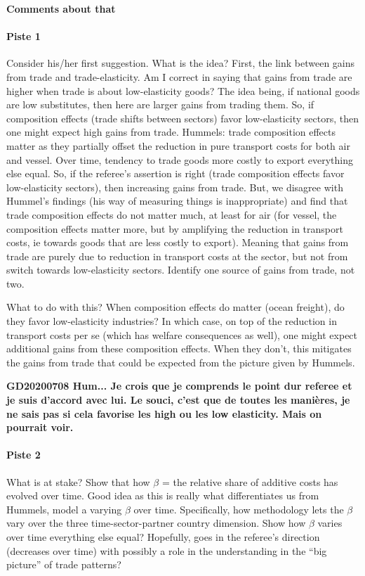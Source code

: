 \documentclass[a4paper,12pt]{article}
\begin{document}
\textbf{Comments about that}

\paragraph{Piste 1} Consider his/her first suggestion. What is the idea? First, the link between gains from trade and trade-elasticity. Am I correct in saying that gains from trade are higher when trade is about low-elasticity goods? The idea being, if national goods are low substitutes, then here are larger gains from trading them. So, if composition effects (trade shifts between sectors) favor low-elasticity sectors, then one might expect high gains from trade. Hummels: trade composition effects matter as they partially offset the reduction in pure transport costs for both air and vessel. Over time, tendency to trade goods more costly to export everything else equal. So, if the referee's assertion is right (trade composition effects favor low-elasticity sectors), then increasing gains from trade. But, we disagree with Hummel's findings (his way of measuring things is inappropriate) and find that trade composition effects do not matter much, at least for air (for vessel, the composition effects matter more, but by amplifying the reduction in transport costs, ie towards goods that are less costly to export). Meaning that gains from trade are purely due to reduction in transport costs at the sector, but not from switch towards low-elasticity sectors. Identify one source of gains from trade, not two.

What to do with this? When composition effects do matter (ocean freight), do they favor low-elasticity industries? In which case, on top of the reduction in transport costs per se (which has welfare consequences as well), one might expect additional gains from these composition effects. When they don't, this mitigates the gains from trade that could be expected from the picture given by Hummels.

\textbf{GD20200708 Hum... Je crois que je comprends le point dur referee et je suis d’accord avec lui. Le souci, c’est que de toutes les manières, je ne sais pas si cela favorise les high ou les low elasticity. Mais on pourrait voir.}

\paragraph{Piste 2} What is at stake? Show that how $\beta$ = the relative share of additive costs has evolved over time. Good idea as this is really what differentiates us from Hummels, model a varying $\beta$ over time. Specifically, how methodology lets the $\beta$ vary over the three time-sector-partner country dimension. Show how $\beta$ varies over time everything else equal? Hopefully, goes in the referee's direction (decreases over time) with possibly a role in the understanding in the ``big picture'' of trade patterns?
\end{document}
